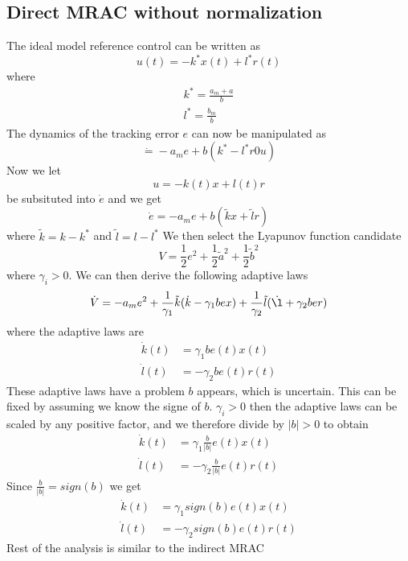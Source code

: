 \documentclass[10pt]{article}
\begin{document}
\begin{multicols*}{2}
\subsection{Direct MRAC without normalization}
The ideal model reference control can be written as
\begin{equation*}
	u(t) = - k ^* x(t) + l ^* r (t)
\end{equation*}
where
\begin{equation*}
	\begin{split}
		k ^* = \frac{a_m + a}{b} \\
		l ^* = \frac{b_m}{b}
	\end{split}
\end{equation*}
The dynamics of the tracking error $e$ can now be manipulated as
\begin{equation*}
	\dot = - a_m e + b (k ^* - l ^* r 0 u)
\end{equation*}
Now we let
\begin{equation*}
	u = -k(t) x + l(t) r
\end{equation*}
be subsituted into $\dot e$ and we get
\begin{equation*}
	\dot e = - a_m e + b (\tilde{k}x + \tilde{l} r)
\end{equation*}
where $\tilde{k}= k - k ^*$ and $\tilde{l}= l - l ^*$
We then select the Lyapunov function candidate
\begin{equation*}
	V = \frac{1}{2} e^2 + \frac{1}{2} \tilde{a}^2 + \frac{1}{2} \tilde{b}^2
\end{equation*}
where $\gamma_i > 0$. We can then derive the following adaptive laws
\begin{equation*}
	\dot V = -a_m e ^2 + \frac{1}{\gamma_1} \tilde{k} (\dot{k} - \gamma_1 b e x) + \frac{1}{\gamma_2} \tilde{l} (\dot{\l} + \gamma_2b e r)
\end{equation*}
where the adaptive laws are
\begin{equation*}
	\begin{split}
		\dot k(t) & = \gamma_1 b e(t) x(t)   \\
		\dot l(t) & = - \gamma_2 b e(t) r(t)
	\end{split}
\end{equation*}
These adaptive laws have a problem $b$ appears, which is uncertain. This can be fixed by assuming we know the signe of $b$. $\gamma_i>0$ then the adaptive laws can be scaled by any positive factor, and we therefore divide by $|b| > 0$ to obtain
\begin{equation*}
	\begin{split}
		\dot k(t) & = \gamma_1 \frac{b}{|b|} e(t) x(t)   \\
		\dot l(t) & = - \gamma_2 \frac{b}{|b|} e(t) r(t)
	\end{split}
\end{equation*}
Since $\frac{b}{|b|}= sign(b)$ we get
\begin{equation*}
	\begin{split}
		\dot k(t) & = \gamma_1 sign(b) e(t) x(t)   \\
		\dot l(t) & = - \gamma_2 sign(b) e(t) r(t)
	\end{split}
\end{equation*}
Rest of the analysis is similar to the indirect MRAC

\end{multicols*}
\end{document}
